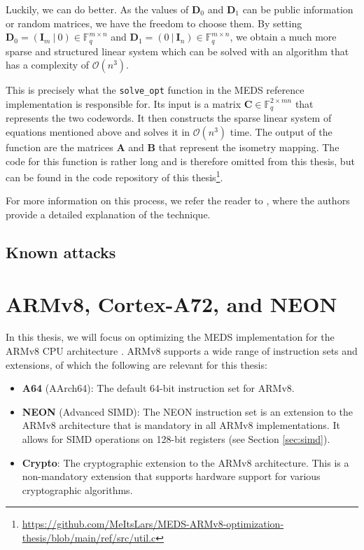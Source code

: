 \documentclass[11pt,a4paper]{report}
\theoremstyle{definition}
\begin{document}
Luckily, we can do better. As the values of $\textbf{D}_0$ and $\textbf{D}_1$ can be public information or random matrices, we have the freedom to choose them. By setting $\textbf{D}_0 = (\textbf{I}_m~|~0) \in \mathbb{F}_q^{m \times n}$ and $\textbf{D}_1 = (0~|~\textbf{I}_n) \in \mathbb{F}_q^{m \times n}$, we obtain a much more sparse and structured linear system which can be solved with an algorithm that has a complexity of $\mathcal{O}(n^3)$.

This is precisely what the \texttt{solve\_opt} function in the MEDS reference implementation is responsible for. Its input is a matrix $\textbf{C} \in \mathbb{F}_q^{2 \times mn}$ that represents the two codewords. It then constructs the sparse linear system of equations mentioned above and solves it in $\mathcal{O}(n^3)$ time. The output of the function are the matrices $\textbf{A}$ and $\textbf{B}$ that represent the isometry mapping. The code for this function is rather long and is therefore omitted from this thesis, but can be found in the code repository of this thesis\footnote{\url{https://github.com/MeItsLars/MEDS-ARMv8-optimization-thesis/blob/main/ref/src/util.c}}.

For more information on this process, we refer the reader to \cite[Section 4.2]{chou2024reducing}, where the authors provide a detailed explanation of the technique.

\subsection{Known attacks}

\section{ARMv8, Cortex-A72, and NEON}
\label{sec:armv8}
In this thesis, we will focus on optimizing the MEDS implementation for the ARMv8 CPU architecture \cite{armv8m}. ARMv8 supports a wide range of instruction sets and extensions, of which the following are relevant for this thesis:
\begin{itemize}
  \item \textbf{A64} (AArch64): The default 64-bit instruction set for ARMv8.
  \item \textbf{NEON} (Advanced SIMD): The NEON instruction set is an extension to the ARMv8 architecture that is mandatory in all ARMv8 implementations. It allows for SIMD operations on 128-bit registers (see Section \ref{sec:simd}).
  \item \textbf{Crypto}: The cryptographic extension to the ARMv8 architecture. This is a non-mandatory extension that supports hardware support for various cryptographic algorithms.
\end{itemize}
\end{document}
